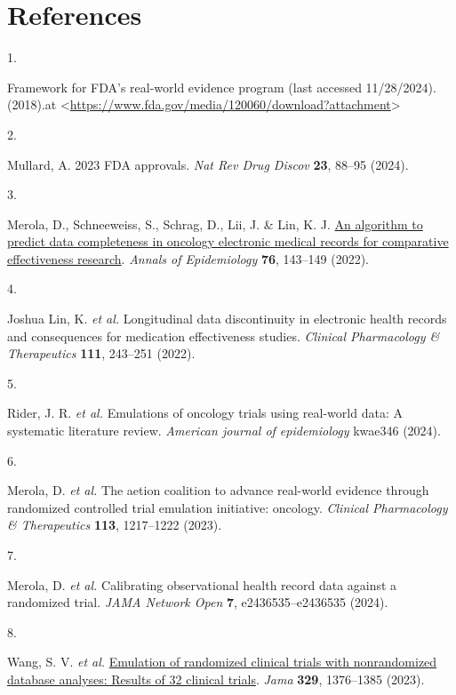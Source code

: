 \documentclass[
  letterpaper,
  DIV=11,
  numbers=noendperiod]{scrartcl}
\newlength{\cslhangindent}
\newlength{\csllabelwidth}
\newenvironment{CSLReferences}[2] %
 {\begin{list}{}{%
  \setlength{\itemindent}{0pt}
  \setlength{\leftmargin}{0pt}
  \setlength{\parsep}{0pt}
  \ifodd #1
   \setlength{\leftmargin}{\cslhangindent}
   \setlength{\itemindent}{-1\cslhangindent}
  \fi
  \setlength{\itemsep}{#2\baselineskip}}}
 {\end{list}}
\newcommand{\CSLLeftMargin}[1]{\parbox[t]{\csllabelwidth}{\strut#1\strut}}
\newcommand{\CSLRightInline}[1]{\parbox[t]{\linewidth - \csllabelwidth}{\strut#1\strut}}
\begin{document}
\section*{References}\label{references}

\label{refs}
\begin{CSLReferences}{0}{0}
\CSLLeftMargin{1. }%
\CSLRightInline{Framework for FDA's real-world evidence program (last
accessed 11/28/2024). (2018).at
\textless{}\url{https://www.fda.gov/media/120060/download?attachment}\textgreater{}}

\CSLLeftMargin{2. }%
\CSLRightInline{Mullard, A. 2023 FDA approvals. \emph{Nat Rev Drug
Discov} \textbf{23}, 88--95 (2024).}

\CSLLeftMargin{3. }%
\CSLRightInline{Merola, D., Schneeweiss, S., Schrag, D., Lii, J. \& Lin,
K. J. \href{https://doi.org/10.1016/j.annepidem.2022.07.007}{An
algorithm to predict data completeness in oncology electronic medical
records for comparative effectiveness research}. \emph{Annals of
Epidemiology} \textbf{76}, 143--149 (2022).}

\CSLLeftMargin{4. }%
\CSLRightInline{Joshua Lin, K. \emph{et al.} Longitudinal data
discontinuity in electronic health records and consequences for
medication effectiveness studies. \emph{Clinical Pharmacology \&
Therapeutics} \textbf{111}, 243--251 (2022).}

\CSLLeftMargin{5. }%
\CSLRightInline{Rider, J. R. \emph{et al.} Emulations of oncology trials
using real-world data: A systematic literature review. \emph{American
journal of epidemiology} kwae346 (2024).}

\CSLLeftMargin{6. }%
\CSLRightInline{Merola, D. \emph{et al.} The aetion coalition to advance
real-world evidence through randomized controlled trial emulation
initiative: oncology. \emph{Clinical Pharmacology \& Therapeutics}
\textbf{113}, 1217--1222 (2023).}

\CSLLeftMargin{7. }%
\CSLRightInline{Merola, D. \emph{et al.} Calibrating observational
health record data against a randomized trial. \emph{JAMA Network Open}
\textbf{7}, e2436535--e2436535 (2024).}

\CSLLeftMargin{8. }%
\CSLRightInline{Wang, S. V. \emph{et al.}
\href{https://doi.org/10.1001/jama.2023.4221}{Emulation of randomized
clinical trials with nonrandomized database analyses: Results of 32
clinical trials}. \emph{Jama} \textbf{329}, 1376--1385 (2023).}


\end{CSLReferences}
\end{document}
